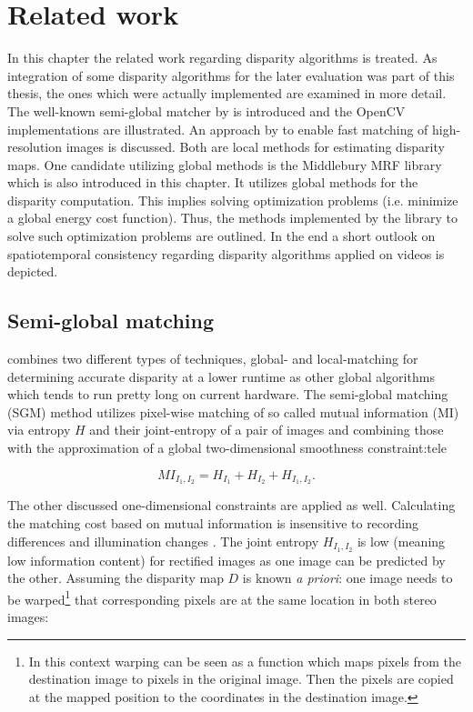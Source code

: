 \chapter{Related work}
\label{chap:related}

In this chapter the related work regarding disparity algorithms is treated.
As integration of some disparity algorithms for the later evaluation was part of this thesis, the ones which were actually implemented are examined in more detail.
The well-known semi-global matcher by \citeauthor{hirschmuller2011semi} is introduced and the OpenCV implementations are illustrated.
An approach by \citeauthor{Geiger2010ACCV} to enable fast matching of high-resolution images is discussed.
Both are local methods for estimating disparity maps.
One candidate utilizing global methods is the Middlebury MRF library which is also introduced in this chapter.
It utilizes global methods for the disparity computation.
This implies solving optimization problems (i.e. minimize a global energy cost function).
Thus, the methods implemented by the library to solve such optimization problems are outlined.
In the end a short outlook on spatiotemporal consistency regarding disparity algorithms applied on videos is depicted.

\section{Semi-global matching}

\citeauthor{hirschmuller2011semi} combines two different types of techniques, global- and local-matching for determining accurate disparity at a lower runtime as other global algorithms which tends to run pretty long on current hardware.
\newline\newline\noindent The semi-global matching (SGM) method utilizes pixel-wise matching of so called mutual information (MI) via entropy $H$ and their joint-entropy of a pair of images and combining those with the approximation of a global two-dimensional smoothness constraint:tele

\begin{equation}
  MI_{I_1,I_2} = H_{I_1} + H_{I_2} + H_{I_1,I_2}.
\end{equation}

\noindent The other discussed one-dimensional constraints are applied as well.
Calculating the matching cost based on mutual information is insensitive to recording differences and illumination changes \citep{viola1997alignment}.
The joint entropy $H_{I_1,I_2}$ is low (meaning low information content) for rectified images as one image can be predicted by the other.
Assuming the disparity map $D$ is known \textit{a priori}: one image needs to be warped\footnote{In this context warping can be seen as a function which maps pixels from the destination image to pixels in the original image. Then the pixels are copied at the mapped position to the coordinates in the destination image.} that corresponding pixels are at the same location in both stereo images:

